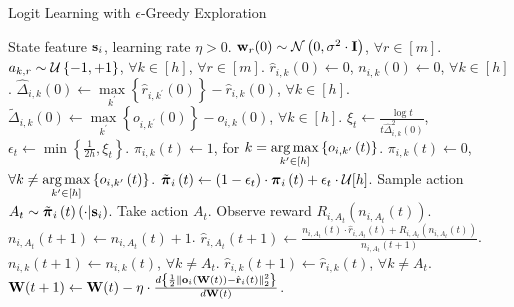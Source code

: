 \begin{algorithm}[t]
   \caption{Logit Learning with $\epsilon$-Greedy Exploration}
\label{alg:logit_learning_eps_greedy_exploration}
\begin{algorithmic}
    State feature ${\mathbf{s}}_i$, learning rate $\eta > 0$.
   \STATE ${\mathbf{w}}_r(0) \sim {\mathcal{N}}\left( 0, \sigma^2 \cdot {\mathbf{I}} \right)$, $\forall r \in [m]$.
   \STATE $a_{k, r} \sim {\mathcal{U}}\left\{-1, +1\right\}$, $\forall k \in [h]$, $\forall r \in [m]$.
   \STATE $\hat{r}_{i,k}\left(0\right) \gets 0$, $n_{i,k}\left(0\right) \gets 0$, $\forall k \in [h]$.
   \STATE $\hat{\Delta}_{i,k}\left(0\right) \gets \max\limits_{k^\prime}\left\{ \hat{r}_{i,k^\prime}\left(0\right) \right\} - \hat{r}_{i,k}\left(0\right)$, $\forall k \in [h]$.
   \STATE $\tilde{\Delta}_{i,k}\left(0\right) \gets \max\limits_{k^\prime}\left\{ o_{i,k^\prime}\left(0\right) \right\} - o_{i,k}\left(0\right)$, $\forall k \in [h]$.
   \STATE $\xi_t \gets \frac{\log{t}}{t \hat{\Delta}_{i,k}^2\left(0\right)}$, $\epsilon_t \gets \min\left\{ \frac{1}{2 h}, \xi_t \right\}$.
   \STATE $\pi_{i, k}\left(t\right) \gets 1$, for $k = \operatorname*{arg\,max}\limits_{k^\prime \in \left[h\right]}\left\{ o_{i, k^\prime}\left(t\right)\right\}$.
   \STATE $\pi_{i, k}\left(t\right) \gets 0$, $\forall k \not= \operatorname*{arg\,max}\limits_{k^\prime \in \left[h\right]}\left\{ o_{i, k^\prime}\left(t\right)\right\}$.
   \STATE $\tilde{{\boldsymbol{\pi}}}_i\left(t\right) \gets \left( 1 - \epsilon_t \right) \cdot  {\boldsymbol{\pi}}_i\left(t\right) + \epsilon_t \cdot {\mathcal{U}}{\left[ h \right]}$.
   \STATE Sample action $A_{t} \sim \tilde{{\boldsymbol{\pi}}}_{i}\left(t\right)\left(\cdot \middle| {\mathbf{s}}_i \right)$.
   \STATE Take action $A_{t}$. Observe reward $R_{i, A_{t}}\left(n_{i, A_{t}}\left(t\right) \right)$.
   \STATE $n_{i, A_{t}}\left(t+1\right) \gets n_{i, A_{t}}\left(t\right) + 1$.
   \STATE $\hat{r}_{i,A_{t}}\left(t+1\right) \gets \frac{n_{i, A_{t}}\left(t\right) \cdot \hat{r}_{i,A_{t}}\left(t\right) + R_{i, A_{t}}\left(n_{i, A_{t}}\left(t\right)\right) }{n_{i, A_{t}}\left(t+1\right)}$.
   \STATE $n_{i, k}\left(t+1\right) \gets n_{i, k}\left(t\right)$, $\forall k \not= A_t$.
   \STATE $\hat{r}_{i,k}\left(t+1\right) \gets \hat{r}_{i,k}\left(t\right)$, $\forall k \not= A_t$.
   \STATE ${\mathbf{W}}(t+1) \leftarrow {\mathbf{W}}(t) - \eta \cdot \frac{d \left\{ \frac{1}{2} \left\| {\mathbf{o}}_i\left( {\mathbf{W}}\left(t\right)\right) - \hat{{\mathbf{r}}}_i\left(t\right) \right\|_2^2 \right\}}{d {\mathbf{W}}(t)}$.
   \ENDFOR
\end{algorithmic}
\end{algorithm}

